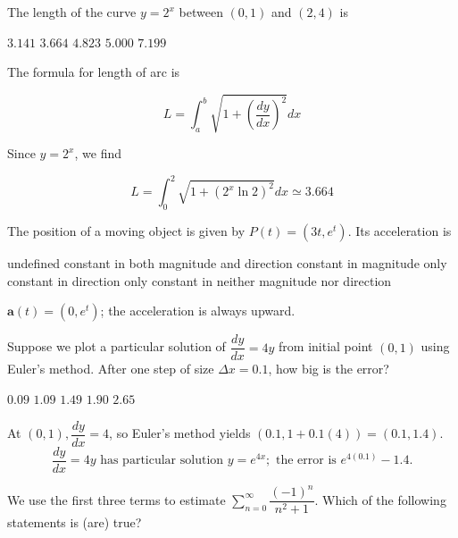 \newpage





\question
The length of the curve $y=2^{x}$ between $(0,1)$ and $(2,4)$ is
\begin{choices}
  \choice $3.141$
  \choice $3.664$
  \choice $4.823$
  \choice $5.000$
  \choice $7.199$
\end{choices}
\begin{solution}
The formula for length of arc is


\[
L=\displaystyle\int_{a}^{b} \sqrt{1+\left(\dfrac{d y}{d x}\right)^{2}} d x
\]

Since $y=2^{x}$, we find

\[
L=\displaystyle\int_{0}^{2} \sqrt{1+\left(2^{x} \ln 2\right)^{2}} d x \simeq 3.664
\]


\end{solution}

\question
The position of a moving object is given by $P(t)=\left(3 t, e^{t}\right)$. Its acceleration is
\begin{choices}
  \choice undefined
  \choice constant in both magnitude and direction
  \choice constant in magnitude only
  \choice constant in direction only
  \choice constant in neither magnitude nor direction
\end{choices}
\begin{solution}
$\mathbf{a}(t)=\left(0, e^{t}\right)$; the acceleration is always upward.
\end{solution}

\question
Suppose we plot a particular solution of $\dfrac{d y}{d x}=4 y$ from initial point $(0,1)$ using Euler's method. After one step of size $\Delta x=0.1$, how big is the error?
\begin{choices}
  \choice $0.09$
  \choice $1.09$
  \choice $1.49$
  \choice $1.90$
  \choice $2.65$
\end{choices}
\begin{solution}
At $(0,1), \dfrac{d y}{d x}=4$, so Euler's method yields $(0.1,1+0.1(4))=(0.1,1.4)$.
\[
\dfrac{d y}{d x}=4 y \text { has particular solution } y=e^{4 x} ; \text { the error is } e^{4(0.1)}-1.4 .
\]
\end{solution}




\newpage



\question
We use the first three terms to estimate $\sum\limits_{n=0}^{\infty} \dfrac{(-1)^{n}}{n^{2}+1}$. Which of the following statements is (are) true?

